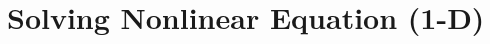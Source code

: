 \documentclass[12pt]{article}
\begin{document}
\section{Solving Nonlinear Equation (1-D)}
\end{document}
